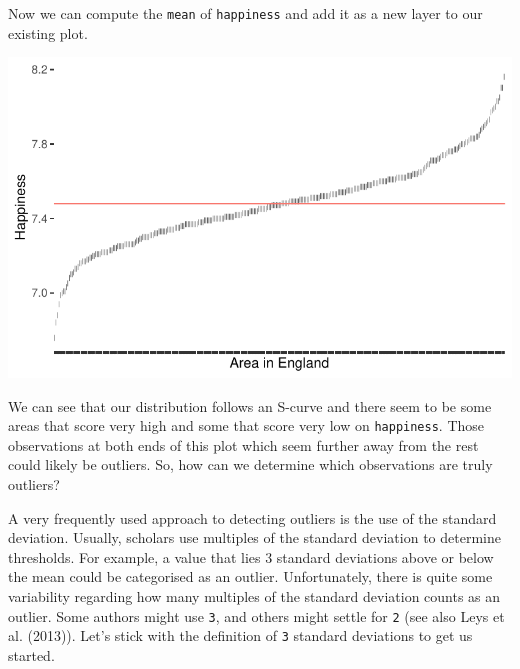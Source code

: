 \documentclass[
  letterpaper,
]{krantz}
\makeatletter
\newenvironment{Shaded}{\begin{snugshade}}{\end{snugshade}}
\newcommand{\AttributeTok}[1]{\textcolor[rgb]{0.40,0.45,0.13}{#1}}
\newcommand{\CommentTok}[1]{\textcolor[rgb]{0.37,0.37,0.37}{#1}}
\newcommand{\ConstantTok}[1]{\textcolor[rgb]{0.56,0.35,0.01}{#1}}
\newcommand{\FunctionTok}[1]{\textcolor[rgb]{0.28,0.35,0.67}{#1}}
\newcommand{\NormalTok}[1]{\textcolor[rgb]{0.00,0.23,0.31}{#1}}
\newcommand{\OtherTok}[1]{\textcolor[rgb]{0.00,0.23,0.31}{#1}}
\newcommand{\SpecialCharTok}[1]{\textcolor[rgb]{0.37,0.37,0.37}{#1}}
\newcommand{\StringTok}[1]{\textcolor[rgb]{0.13,0.47,0.30}{#1}}
\newenvironment{kframe}{%
\medskip{}
\setlength{\fboxsep}{.8em}
 \def\at@end@of@kframe{}%
 \ifinner\ifhmode%
  \def\at@end@of@kframe{\end{minipage}}%
  \begin{minipage}{\columnwidth}%
 \fi\fi%
 \def\FrameCommand##1{\hskip\@totalleftmargin \hskip-\fboxsep
 \colorbox{shadecolor}{##1}\hskip-\fboxsep
     \hskip-\linewidth \hskip-\@totalleftmargin \hskip\columnwidth}%
 \MakeFramed {\advance\hsize-\width
   \@totalleftmargin\z@ \linewidth\hsize
   \@setminipage}}%
 {\par\unskip\endMakeFramed%
 \at@end@of@kframe}
\renewenvironment{Shaded}{\begin{kframe}}{\end{kframe}}
\makeatother
\begin{document}
Now we can compute the \texttt{mean} of \texttt{happiness} and add it as
a new layer to our existing plot.

\begin{Shaded}
\end{Shaded}

\includegraphics{09_sources_of_bias_files/figure-pdf/deviation-plot-with-mean-happiness-1.pdf}

We can see that our distribution follows an S-curve and there seem to be
some areas that score very high and some that score very low on
\texttt{happiness}. Those observations at both ends of this plot which
seem further away from the rest could likely be outliers. So, how can we
determine which observations are truly outliers?

A very frequently used approach to detecting outliers is the use of the
standard deviation. Usually, scholars use multiples of the standard
deviation to determine thresholds. For example, a value that lies 3
standard deviations above or below the mean could be categorised as an
outlier. Unfortunately, there is quite some variability regarding how
many multiples of the standard deviation counts as an outlier. Some
authors might use \texttt{3}, and others might settle for \texttt{2}
(see also Leys et al. (2013)). Let's stick with the definition of
\texttt{3} standard deviations to get us started.
\end{document}
